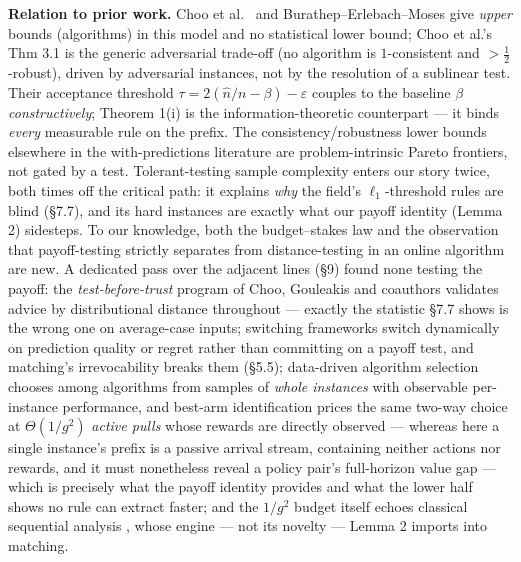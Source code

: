 \textbf{Relation to prior work.} Choo et al.~\cite{choo2024imperfect}
and Burathep--Erlebach--Moses \cite{bem2026testmatch} give \emph{upper}
bounds (algorithms) in this model and no statistical lower bound; Choo
et al.'s Thm 3.1 is the generic adversarial trade-off (no algorithm is
\(1\)-consistent and \(>\tfrac12\)-robust), driven by adversarial
instances, not by the resolution of a sublinear test. Their acceptance
threshold \(\tau = 2(\hat n/n-\beta)-\varepsilon\) couples to the
baseline \(\beta\) \emph{constructively}; Theorem 1(i) is the
information-theoretic counterpart --- it binds \emph{every} measurable
rule on the prefix. The consistency/robustness lower bounds elsewhere in
the with-predictions literature \cite{weizhang2020tradeoffs} are
problem-intrinsic Pareto frontiers, not gated by a test.
Tolerant-testing sample complexity \cite{canonne2022tolerance} enters
our story twice, both times off the critical path: it explains
\emph{why} the field's \(\ell_1\)-threshold rules are blind (§7.7), and
its hard instances are exactly what our payoff identity (Lemma 2)
sidesteps. To our knowledge, both the budget--stakes law and the
observation that payoff-testing strictly separates from distance-testing
in an online algorithm are new. A dedicated pass over the adjacent lines
(§9) found none testing the payoff: the \emph{test-before-trust} program
of Choo, Gouleakis and coauthors
\cite{choo2024imperfect,bhattacharyya2025product} validates advice by
distributional distance throughout --- exactly the statistic §7.7 shows
is the wrong one on average-case inputs; switching frameworks
\cite{chledowski2021caching,antoniadis2025switching} switch dynamically
on prediction quality or regret rather than committing on a payoff test,
and matching's irrevocability breaks them (§5.5); data-driven algorithm
selection \cite{gupta2017pac,balcan2020datadriven} chooses among
algorithms from samples of \emph{whole instances} with observable
per-instance performance, and best-arm identification prices the same
two-way choice at \(\Theta(1/g^2)\) \emph{active pulls} whose rewards
are directly observed \cite{mannortsitsiklis2004,kaufmann2016complexity}
--- whereas here a single instance's prefix is a passive arrival stream,
containing neither actions nor rewards, and it must nonetheless reveal a
policy pair's full-horizon value gap --- which is precisely what the
payoff identity provides and what the lower half shows no rule can
extract faster; and the \(1/g^2\) budget itself echoes classical
sequential analysis \cite{wald1947sequential}, whose engine --- not its
novelty --- Lemma 2 imports into matching.

